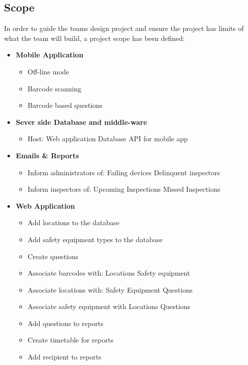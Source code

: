 \documentclass[Letter,11pt]{article}
\begin{document}
	\subsection{Scope}\label{scope}
	In order to guide the teams design project and ensure the project has limits of what the team will build, a project scope has been defined:
	\\
	\begin{minipage}[t]{0.5\textwidth}
		\begin{itemize}
			\item \textbf{Mobile Application}
			\begin{itemize}
				\item Off-line mode
				\item Barcode scanning
				\item Barcode based questions
			\end{itemize}
			\item \textbf{Sever side Database and middle-ware}
			\begin{itemize}
				\item Host:
					\subitem Web application
					\subitem Database API for mobile app
			\end{itemize}
			\item\textbf{ Emails \& Reports}
			\begin{itemize}
				\item Inform administrators of:
					\subitem Failing devices
					\subitem Delinquent inspectors
				\item Inform inspectors of:
					\subitem Upcoming Inspections
					\subitem Missed Inspections
			\end{itemize}
		\end{itemize}
	\end{minipage}
	\begin{minipage}[t]{0.5\textwidth}
		\begin{itemize}
			\item \textbf{Web Application}
				\begin{itemize}
					\item Add locations to the database
					\item Add safety equipment types to the database
					\item Create questions
					\item Associate barcodes with:
						\subitem Locations
						\subitem Safety equipment
					\item Associate locations with:
						\subitem Safety Equipment
						\subitem Questions
					\item Associate safety equipment with
						\subitem Locations
						\subitem Questions
					\item Add questions to reports
					\item Create timetable for reports
					\item Add recipient to reports
				\end{itemize}
		\end{itemize}
	\end{minipage}
		
\end{document}
